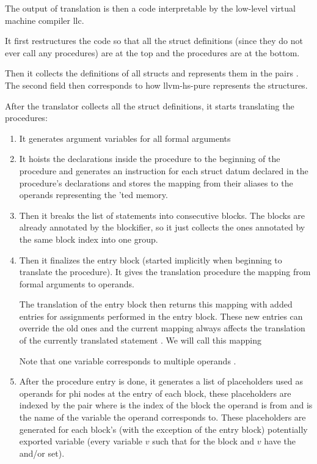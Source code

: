 The output of translation is then a code interpretable by the low-level virtual machine compiler llc.

It first restructures the code so that all the struct definitions (since they do not ever call any procedures) are at the top and the procedures are at the bottom.

Then it collects the definitions of all structs and represents them in the pairs \linebreak {}. The second field then corresponds to how llvm-hs-pure represents the structures.

After the translator collects all the struct definitions, it starts translating the procedures:

\begin{enumerate}
    \item It generates argument variables for all formal arguments

    \item It hoists the declarations inside the procedure to the beginning of the procedure and generates an  instruction for each struct datum declared in the procedure's  declarations and stores the mapping from their aliases to the operands representing the 'ted memory.
    
    \item Then it breaks the list of statements into consecutive blocks. The blocks are already annotated by the blockifier, so it just collects the ones annotated by the same block index into one group.
    
    \item Then it finalizes the entry block (started implicitly when beginning to translate the procedure). It gives the translation procedure the mapping from formal arguments to operands.
    
    
    The translation of the entry block then returns this mapping with added entries for assignments performed in the entry block. These new entries can override the old ones and the current mapping always affects the translation of the currently translated statement . We will call this mapping 
    
    Note that one variable corresponds to multiple operands . 

    \item After the procedure entry is done, it generates a list  of placeholders used as operands for phi nodes at the entry of each block, these placeholders are indexed by the pair  where  is the index of the block the operand is from and  is the name of the variable the operand corresponds to. These placeholders are generated for each block's (with the exception of the entry block) potentially exported variable (every variable $v$ such that  for the block and $v$ have the  and/or  set).
    

\end{enumerate}
